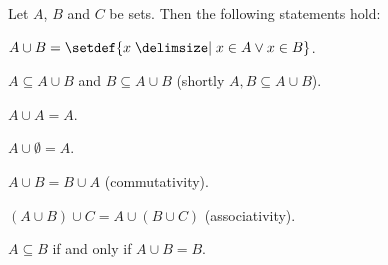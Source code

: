 \begin{theorem}\label{theorem:sets:union_pair_properties}
    Let $A$, $B$ and $C$ be sets. Then the following statements hold:
    \begin{intheoremenumerate}
        \item\label{theorem:sets:union_disjunction} $A\cup B=\setdef{x\given x\in A\lor x\in B}$.
        \item\label{theorem:sets:union_subsets} $A\subseteq A\cup B$ and $B\subseteq A\cup B$ (shortly $A,B\subseteq A\cup B$).
        \item $A\cup A=A$.
        \item $A\cup\emptyset=A$.
        \item $A\cup B=B\cup A$ (commutativity).
        \item $(A\cup B)\cup C=A\cup (B\cup C)$ (associativity).
        \item\label{theorem:sets:union_absorbption} $A\subseteq B$ if and only if $A\cup B=B$.
    \end{intheoremenumerate}
\end{theorem}
